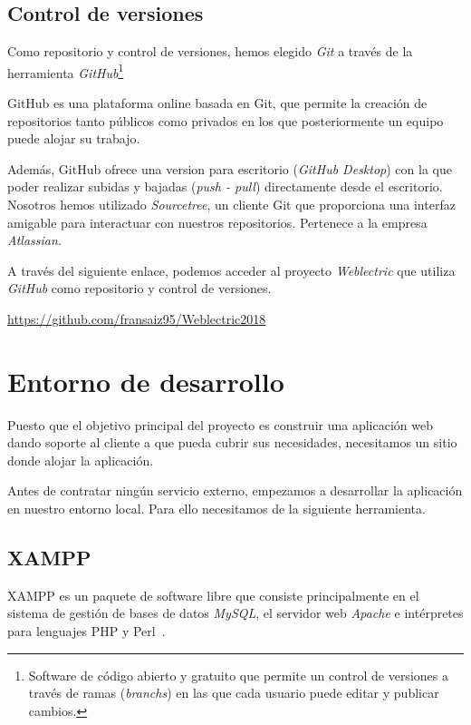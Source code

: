 \subsection{Control de versiones}

Como repositorio y control de versiones, hemos elegido \textit{Git} a través de la herramienta \textit{GitHub}\footnote{Software de código abierto y gratuito que permite un control de versiones a través de ramas (\textit{branchs}) en las que cada usuario puede editar y publicar cambios.}

GitHub es una plataforma online basada en Git, que permite la creación de repositorios tanto públicos como privados en los que posteriormente un equipo puede alojar su trabajo.

Además, GitHub ofrece una version para escritorio (\textit{GitHub Desktop}) con la que poder realizar subidas y bajadas (\textit{push - pull}) directamente desde el escritorio. Nosotros hemos utilizado \textit{Sourcetree}, un cliente Git que proporciona una interfaz amigable para interactuar con nuestros repositorios. Pertenece a la empresa \textit{Atlassian.}

A través del siguiente enlace, podemos acceder al proyecto \textit{Weblectric} que utiliza \textit{GitHub} como repositorio y control de versiones.

\url{https://github.com/fransaiz95/Weblectric2018}

\newpage

\section{Entorno de desarrollo}

Puesto que el objetivo principal del proyecto es construir una aplicación web dando soporte al cliente a que pueda cubrir sus necesidades, necesitamos un sitio donde alojar la aplicación. 

Antes de contratar ningún servicio externo, empezamos a desarrollar la aplicación en nuestro entorno local. Para ello necesitamos de la siguiente herramienta.

\subsection{XAMPP}

XAMPP es un paquete de software libre que consiste principalmente en el sistema de gestión de bases de datos \textit{MySQL}, el servidor web \textit{Apache} e intérpretes para lenguajes PHP y Perl~\cite{wiki:xampp}.

